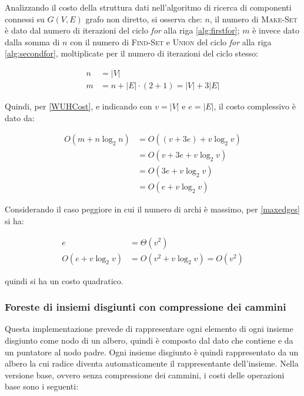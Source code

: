 Analizzando il costo della struttura dati nell'algoritmo di ricerca di componenti connessi
su $G(V,E)$ grafo non diretto, si osserva che: $n$, il numero di \textsc{Make-Set} è dato
dal numero di iterazioni del ciclo \textit{for} alla riga \ref{alg:firstfor}; $m$ è invece
dato dalla somma di $n$ con il numero di \textsc{Find-Set} e \textsc{Union} del ciclo
\textit{for} alla riga \ref{alg:secondfor}, moltiplicate per il numero di iterazioni del
ciclo stesso:

\begin{equation}
    \begin{aligned}
        n & = |V|                                 \\
        m & = n + |E| \cdot (2 + 1) = |V| + 3 |E|
    \end{aligned}
\end{equation}

Quindi, per \eqref{WUHCost}, e indicando con $v = |V|$ e $e = |E|$, il costo complessivo è dato da:

\begin{equation}
    \begin{aligned}
        O(m+n\log_2n) & = O((v + 3 e) + v\log_2v) \\
                      & = O(v + 3 e + v\log_2v)   \\
                      & = O(3e+ v\log_2v)         \\
                      & = O(e + v\log_2v)
    \end{aligned}
\end{equation}

Considerando il caso peggiore in cui il numero di archi è massimo, per \eqref{maxedges} si ha:

\begin{equation}
    \begin{aligned}
        e             & = \Theta(v^2)               \\
        O(e+v\log_2v) & = O(v^2+ v\log_2v) = O(v^2)
    \end{aligned}
\end{equation}

quindi si ha un costo quadratico.
\newpage

\subsubsection{Foreste di insiemi disgiunti con compressione dei cammini}
Questa implementazione prevede di rappresentare ogni elemento di ogni insieme disgiunto
come nodo di un albero, quindi è composto dal dato che contiene e da un puntatore al nodo
padre. Ogni insieme disgiunto è quindi rappresentato da un albero la cui radice diventa
automaticamente il rappresentante dell'insieme. Nella versione base, ovvero senza compressione
dei cammini, i costi delle operazioni base sono i seguenti:

